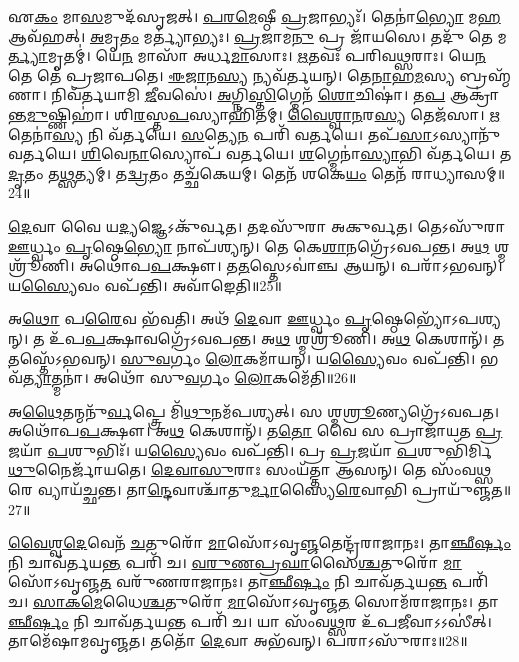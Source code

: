𑌏\-\ul{𑌕𑌂} 𑌮𑌾\-\ul{𑌸}\-𑌮𑍁𑌦᳴\-𑌸𑍃𑌜𑌤𑍍।
\-\ul{𑌪}\-\-\ul{𑌰}\-\-\ul{𑌮𑍇}\-𑌷𑍍𑌠𑍀 \ul{𑌪𑍍𑌰}\-𑌜𑌾𑌭𑍍𑌯𑌃᳴।
𑌤𑍇𑌨𑌾॑\-\ul{𑌭𑍍𑌯𑍋} 𑌮\-\ul{𑌹} 𑌆𑌵᳴𑌹𑌤𑍍।
\-\ul{𑌅}\-𑌮𑍃\-\ul{𑌤𑌂} 𑌮𑌰𑍍𑌤𑍍𑌯𑌾॑𑌭𑍍𑌯𑌃।
\-\ul{𑌪𑍍𑌰}\-𑌜𑌾𑌮\-\ul{𑌨𑍁} 𑌪𑍍𑌰 𑌜𑌾᳴𑌯𑌸𑍇।
𑌤𑌦𑍁᳴ 𑌤𑍇 𑌮\-\ul{𑌰𑍍𑌤𑍍𑌯𑌾}\-𑌮𑍃𑌤𑌮𑍍॑।
𑌯𑍇\-\ul{𑌨} 𑌮𑌾𑌸𑌾᳴ 𑌅𑌰𑍍𑌧\-\ul{𑌮𑌾}\-𑌸𑌾𑌃।
\-\ul{𑌋}\-𑌤𑌵𑌃᳴ 𑌪𑌰𑌿𑌵\-\ul{𑌥𑍍𑌸}\-𑌰𑌾𑌃।
𑌯𑍇\-\ul{𑌨} 𑌤𑍇 𑌤𑍇॑ 𑌪𑍍𑌰𑌜𑌾𑌪𑌤𑍇।
\-\ul{𑌈}\-\-\ul{𑌜𑌾}\-𑌨\-\ul{𑌸𑍍𑌯} 𑌨𑍍𑌯𑌵᳴𑌰𑍍𑌤𑌯𑌨𑍍।
𑌤𑍇\-\ul{𑌨𑌾}\-𑌹\-\ul{𑌮}\-𑌸𑍍𑌯 𑌬𑍍𑌰𑌹𑍍𑌮᳴𑌣𑌾।
𑌨𑌿𑌵᳴𑌰𑍍𑌤𑌯𑌾𑌮𑌿 \ul{𑌜𑍀}\-𑌵𑌸𑍇॑।
\-\ul{𑌅}\-𑌗𑍍𑌨𑌿\-\ul{𑌸𑍍𑌤𑌿}\-𑌗𑍍𑌮𑍇𑌨᳴ \ul{𑌶𑍋}\-𑌚𑌿𑌷𑌾॑।
𑌤\-\ul{𑌪} 𑌆𑌕𑍍𑌰𑌾॑𑌨𑍍𑌤\-\ul{𑌮𑍁}\-𑌷𑍍𑌣𑌿𑌹𑌾॑।
𑌶𑌿\-\ul{𑌰}\-𑌸𑍍𑌤\-\ul{𑌪}\-𑌸𑍍𑌯𑌾𑌹𑌿᳴𑌤𑌮𑍍।
\-\ul{𑌵𑍈}\-\-\ul{𑌶𑍍𑌵𑌾}\-\-\ul{𑌨}\-𑌰\-\ul{𑌸𑍍𑌯} 𑌤𑍇𑌜᳴𑌸𑌾।
\-\ul{𑌋}\-𑌤𑍇𑌨𑌾॑\-\ul{𑌸𑍍𑌯} 𑌨𑌿 𑌵᳴𑌰𑍍𑌤𑌯𑍇।
\-\ul{𑌸}\-𑌤𑍍𑌯𑍇\-\ul{𑌨} 𑌪𑌰𑌿᳴ 𑌵𑌰𑍍𑌤𑌯𑍇।
𑌤𑌪᳴\-\ul{𑌸𑌾}\-\-𑌽𑌸𑍍𑌯𑌾𑌨𑍁᳴ 𑌵𑌰𑍍𑌤𑌯𑍇।
\-\ul{𑌶𑌿}\-𑌵𑍇\-\ul{𑌨𑌾}\-𑌸𑍍𑌯𑍋𑌪᳴ 𑌵𑌰𑍍𑌤𑌯𑍇।
\-\ul{𑌶}\-𑌗𑍍𑌮𑍇𑌨𑌾॑\-\ul{𑌸𑍍𑌯𑌾}\-𑌭𑌿 𑌵᳴𑌰𑍍𑌤𑌯𑍇।
𑌤\-\ul{𑌦𑍃}\-𑌤𑌂 𑌤\-\ul{𑌥𑍍𑌸}\-𑌤𑍍𑌯𑌮𑍍।
𑌤\-\ul{𑌦𑍍𑌵𑍍𑌰}\-𑌤𑌂 𑌤𑌚𑍍𑌛᳴𑌕𑍇𑌯𑌮𑍍।
𑌤𑍇𑌨᳴ 𑌶𑌕𑍇\-\ul{𑌯𑌂} 𑌤𑍇𑌨᳴ 𑌰𑌾𑌧𑍍𑌯𑌾𑌸𑌮𑍍॥24॥

\-\ul{𑌦𑍇}\-𑌵𑌾 𑌵𑍈 𑌯\-\ul{𑌦𑍍𑌯}\-𑌜𑍍𑌞𑍇\-𑌽𑌕𑍁᳴𑌰𑍍𑌵𑌤।
𑌤𑌦𑌸𑍁᳴𑌰𑌾 𑌅𑌕𑍁𑌰𑍍𑌵𑌤।
𑌤𑍇𑌽𑌸𑍁᳴𑌰𑌾 \ul{𑌊}\-𑌰𑍍𑌧𑍍𑌵𑌂 \ul{𑌪𑍃}\-𑌷𑍍𑌠𑍇\-\ul{𑌭𑍍𑌯𑍋} 𑌨𑌾𑌪᳴𑌶𑍍𑌯𑌨𑍍।
𑌤𑍇 𑌕𑍇\-\ul{𑌶𑌾}\-𑌨𑌗𑍍𑌰𑍇᳴\-𑌽𑌵𑌪𑌨𑍍𑌤।
𑌅\-\ul{𑌥} 𑌶𑍍𑌮𑌶𑍍𑌰𑍂᳴𑌣𑌿।
𑌅𑌥𑍋᳴𑌪\-\ul{𑌪}\-𑌕𑍍𑌷𑍗।
𑌤\-\ul{𑌤}\-𑌸𑍍𑌤𑍇\-𑌽𑌵𑌾॑𑌞𑍍𑌚 𑌆𑌯𑌨𑍍।
𑌪𑌰𑌾᳴𑌽𑌭𑌵𑌨𑍍।
𑌯\-\ul{𑌸𑍍𑌯𑍈}\-𑌵𑌂 𑌵𑌪᳴𑌨𑍍𑌤𑌿।
𑌅𑌵𑌾᳴𑌙𑍇𑌤𑌿॥25॥

𑌅\-\ul{𑌥𑍋} 𑌪\-\ul{𑌰𑍈}\-𑌵 𑌭᳴𑌵𑌤𑌿।
𑌅𑌥᳴ \ul{𑌦𑍇}\-𑌵𑌾 \ul{𑌊}\-𑌰𑍍𑌧𑍍𑌵𑌂 \ul{𑌪𑍃}\-𑌷𑍍𑌠𑍇𑌭𑍍𑌯𑍋᳴\-𑌽𑌪𑌶𑍍𑌯𑌨𑍍।
𑌤 𑌉᳴𑌪\-\ul{𑌪}\-𑌕𑍍𑌷𑌾𑌵𑌗𑍍𑌰𑍇᳴\-𑌽𑌵𑌪𑌨𑍍𑌤।
𑌅\-\ul{𑌥} 𑌶𑍍𑌮𑌶𑍍𑌰𑍂᳴𑌣𑌿।
𑌅\-\ul{𑌥} 𑌕𑍇𑌶𑌾𑌨𑍍᳴।
𑌤\-\ul{𑌤}\-𑌸𑍍𑌤𑍇᳴\-𑌽𑌭𑌵𑌨𑍍।
\-\ul{𑌸𑍁}\-\-\ul{𑌵}\-𑌰𑍍𑌗𑌂 \ul{𑌲𑍋}\-𑌕𑌮𑌾᳴𑌯𑌨𑍍।
𑌯\-\ul{𑌸𑍍𑌯𑍈}\-𑌵𑌂 𑌵𑌪᳴𑌨𑍍𑌤𑌿।
𑌭𑌵᳴\-\ul{𑌤𑍍𑌯𑌾}\-𑌤𑍍𑌮𑌨𑌾॑।
𑌅𑌥𑍋᳴ 𑌸𑍁\-\ul{𑌵}\-𑌰𑍍𑌗𑌂 \ul{𑌲𑍋}\-𑌕𑌮𑍇᳴𑌤𑌿॥26॥

𑌅\-\ul{𑌥𑍈}\-𑌤𑌨𑍍𑌮𑌨𑍁᳴\-\ul{𑌰𑍍𑌵}\-𑌪𑍍𑌤𑍍𑌰𑍇 𑌮𑌿᳴\-\ul{𑌥𑍁}\-𑌨𑌮᳴𑌪𑌶𑍍𑌯𑌤𑍍।
𑌸 𑌶𑍍𑌮\-\ul{𑌶𑍍𑌰𑍂}\-𑌣𑍍𑌯𑌗𑍍𑌰𑍇᳴𑌽𑌵𑌪𑌤।
𑌅𑌥𑍋᳴𑌪\-\ul{𑌪}\-𑌕𑍍𑌷𑍗।
𑌅\-\ul{𑌥} 𑌕𑍇𑌶𑌾𑌨𑍍᳴।
𑌤\-\ul{𑌤𑍋} 𑌵𑍈 𑌸 𑌪𑍍𑌰𑌾𑌜𑌾᳴𑌯𑌤 \ul{𑌪𑍍𑌰}\-𑌜𑌯𑌾᳴ \ul{𑌪}\-𑌶𑍁𑌭𑌿𑌃᳴।
𑌯\-\ul{𑌸𑍍𑌯𑍈}\-𑌵𑌂 𑌵𑌪᳴𑌨𑍍𑌤𑌿।
𑌪𑍍𑌰 \ul{𑌪𑍍𑌰}\-𑌜𑌯𑌾᳴ \ul{𑌪}\-𑌶𑍁𑌭𑌿᳴𑌰𑍍𑌮𑌿\-\ul{𑌥𑍁}\-𑌨𑍈𑌰𑍍𑌜𑌾᳴𑌯𑌤𑍇।
\-\ul{𑌦𑍇}\-\-\ul{𑌵𑌾}\-\-\ul{𑌸𑍁}\-𑌰𑌾𑌃 𑌸𑌂𑌯᳴𑌤𑍍𑌤𑌾 𑌆𑌸𑌨𑍍।
𑌤𑍇 𑌸𑌂᳴𑌵\-\ul{𑌥𑍍𑌸}\-𑌰𑍇 𑌵𑍍𑌯𑌾𑌯᳴𑌚𑍍𑌛𑌨𑍍𑌤।
𑌤𑌾\-\ul{𑌨𑍍𑌦𑍇}\-𑌵𑌾𑌶𑍍𑌚𑌾᳴𑌤𑍁\-\ul{𑌰𑍍𑌮𑌾}\-𑌸𑍍𑌯𑍈\-\ul{𑌰𑍇}\-𑌵𑌾𑌭𑌿 𑌪𑍍𑌰𑌾𑌯𑍁᳴𑌞𑍍𑌜𑌤॥27॥

\-\ul{𑌵𑍈}\-\-\ul{𑌶𑍍𑌵}\-\-\ul{𑌦𑍇}\-𑌵𑍇𑌨᳴ \ul{𑌚}\-𑌤𑍁𑌰𑍋᳴ \ul{𑌮𑌾}\-𑌸𑍋᳴\-𑌽𑌵𑍃\-\ul{𑌞𑍍𑌜}\-𑌤𑍇𑌨𑍍𑌦𑍍𑌰᳴𑌰𑌾𑌜𑌾𑌨𑌃।
𑌤𑌾\-\ul{𑌞𑍍𑌛𑍀}\-\-\ul{𑌰𑍍}\-𑌷𑌂 𑌨𑌿 𑌚𑌾𑌵᳴𑌰𑍍𑌤𑌯\-\ul{𑌨𑍍𑌤} 𑌪𑌰𑌿᳴ 𑌚।
\-\ul{𑌵}\-\-\ul{𑌰𑍁}\-\-\ul{𑌣}\-\-\ul{𑌪𑍍𑌰}\-\-\ul{𑌘𑌾}\-𑌸𑍈\-\ul{𑌶𑍍𑌚}\-𑌤𑍁𑌰𑍋᳴ \ul{𑌮𑌾}\-𑌸𑍋᳴\-𑌽𑌵𑍃𑌞𑍍𑌜\-\ul{𑌤} 𑌵𑌰𑍁᳴𑌣𑌰𑌾𑌜𑌾𑌨𑌃।
𑌤𑌾\-\ul{𑌞𑍍𑌛𑍀}\-\-\ul{𑌰𑍍}\-𑌷𑌂 𑌨𑌿 𑌚𑌾𑌵᳴𑌰𑍍𑌤𑌯\-\ul{𑌨𑍍𑌤} 𑌪𑌰𑌿᳴ 𑌚।
\-\ul{𑌸𑌾}\-\-\ul{𑌕}\-\-\ul{𑌮𑍇}\-𑌧𑍈\-\ul{𑌶𑍍𑌚}\-𑌤𑍁𑌰𑍋᳴ \ul{𑌮𑌾}\-𑌸𑍋᳴\-𑌽𑌵𑍃𑌞𑍍𑌜\-\ul{𑌤} 𑌸𑍋𑌮᳴𑌰𑌾𑌜𑌾𑌨𑌃।
𑌤𑌾\-\ul{𑌞𑍍𑌛𑍀}\-\-\ul{𑌰𑍍}\-𑌷𑌂 𑌨𑌿 𑌚𑌾𑌵᳴𑌰𑍍𑌤𑌯\-\ul{𑌨𑍍𑌤} 𑌪𑌰𑌿᳴ 𑌚।
𑌯𑌾 𑌸𑌂᳴𑌵\-\ul{𑌥𑍍𑌸}\-𑌰 𑌉᳴𑌪\-\ul{𑌜𑍀}\-𑌵𑌾\-𑌽𑌽𑌸𑍀॑𑌤𑍍।
𑌤𑌾𑌮𑍇᳴𑌷𑌾𑌮𑌵𑍃𑌞𑍍𑌜𑌤।
𑌤𑌤𑍋᳴ \ul{𑌦𑍇}\-𑌵𑌾 𑌅𑌭᳴𑌵𑌨𑍍।
𑌪𑌰𑌾𑌽𑌸𑍁᳴𑌰𑌾𑌃॥28॥

